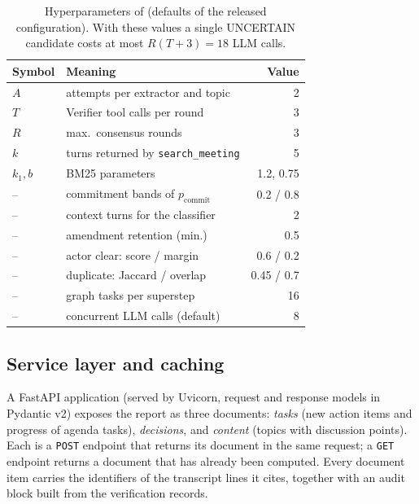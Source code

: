 \begin{table}[t]
\centering
\small
\begin{tabular}{@{}llr@{}}
\toprule
Symbol & Meaning & Value \\
\midrule
$A$ & attempts per extractor and topic & 2 \\
$T$ & Verifier tool calls per round & 3 \\
$R$ & max.\ consensus rounds & 3 \\
$k$ & turns returned by \texttt{search\_meeting} & 5 \\
$k_1, b$ & BM25 parameters & 1.2, 0.75 \\
-- & commitment bands of $p_{\text{commit}}$ & 0.2 / 0.8 \\
-- & context turns for the classifier & 2 \\
-- & amendment retention (min.) & 0.5 \\
-- & actor clear: score / margin & 0.6 / 0.2 \\
-- & duplicate: Jaccard / overlap & 0.45 / 0.7 \\
-- & graph tasks per superstep & 16 \\
-- & concurrent LLM calls (default) & 8 \\
\bottomrule
\end{tabular}
\caption{Hyperparameters of \method{} (defaults of the released configuration). With these values a single UNCERTAIN candidate costs at most $R(T{+}3)=18$ LLM calls.}
\label{tab:hparams}
\end{table}

\subsection{Service layer and caching}
\label{sec:system:service}

A FastAPI application (served by Uvicorn, request and response models in Pydantic v2) exposes the report as three documents: \emph{tasks} (new action items and progress of agenda tasks), \emph{decisions}, and \emph{content} (topics with discussion points).
Each is a \texttt{POST} endpoint that returns its document in the same request; a \texttt{GET} endpoint returns a document that has already been computed.
Every document item carries the identifiers of the transcript lines it cites, together with an audit block built from the verification records.

